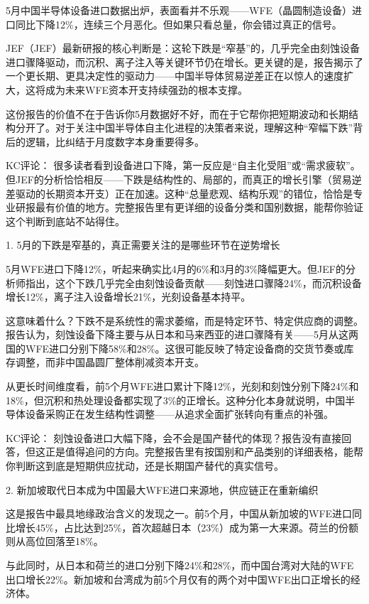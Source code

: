 \documentclass[11pt]{ctexart}
\begin{document}
5月中国半导体设备进口数据出炉，表面看并不乐观——WFE（晶圆制造设备）进口同比下降12\%，连续三个月恶化。但如果只看总量，你会错过真正的信号。

JEF（JEF）最新研报的核心判断是：这轮下跌是“窄基”的，几乎完全由刻蚀设备进口骤降驱动，而沉积、离子注入等关键环节仍在增长。更关键的是，报告揭示了一个更长期、更具决定性的驱动力——中国半导体贸易逆差正在以惊人的速度扩大，这将成为未来WFE资本开支持续强劲的根本支撑。

这份报告的价值不在于告诉你5月数据好不好，而在于它帮你把短期波动和长期结构分开了。对于关注中国半导体自主化进程的决策者来说，理解这种“窄幅下跌”背后的逻辑，比纠结于月度数字本身重要得多。

KC评论： 很多读者看到设备进口下降，第一反应是“自主化受阻”或“需求疲软”。但JEF的分析恰恰相反——下跌是结构性的、局部的，而真正的增长引擎（贸易逆差驱动的长期资本开支）正在加速。这种“总量悲观、结构乐观”的错位，恰恰是专业研报最有价值的地方。完整报告里有更详细的设备分类和国别数据，能帮你验证这个判断到底站不站得住。

1. 5月的下跌是窄基的，真正需要关注的是哪些环节在逆势增长

5月WFE进口下降12\%，听起来确实比4月的6\%和3月的3\%降幅更大。但JEF的分析师指出，这个下跌几乎完全由刻蚀设备贡献——刻蚀进口骤降24\%，而沉积设备增长12\%，离子注入设备增长21\%，光刻设备基本持平。

这意味着什么？下跌不是系统性的需求萎缩，而是特定环节、特定供应商的调整。报告认为，刻蚀设备下降主要与从日本和马来西亚的进口骤降有关——5月从这两国的WFE进口分别下降58\%和28\%。这很可能反映了特定设备商的交货节奏或库存调整，而非中国晶圆厂整体削减资本开支。

从更长时间维度看，前5个月WFE进口累计下降12\%，光刻和刻蚀分别下降24\%和18\%，但沉积和热处理设备都实现了3\%的正增长。这种分化本身就说明，中国半导体设备采购正在发生结构性调整——从追求全面扩张转向有重点的补强。

KC评论： 刻蚀设备进口大幅下降，会不会是国产替代的体现？报告没有直接回答，但这正是值得追问的方向。完整报告里有按国别和产品类别的详细表格，能帮你判断这到底是短期供应扰动，还是长期国产替代的真实信号。

2. 新加坡取代日本成为中国最大WFE进口来源地，供应链正在重新编织

这是报告中最具地缘政治含义的发现之一。前5个月，中国从新加坡的WFE进口同比增长45\%，占比达到25\%，首次超越日本（23\%）成为第一大来源。荷兰的份额则从高位回落至18\%。

与此同时，从日本和荷兰的进口分别下降24\%和28\%，而中国台湾对大陆的WFE出口增长22\%。新加坡和台湾成为前5个月仅有的两个对中国WFE出口正增长的经济体。
\end{document}
